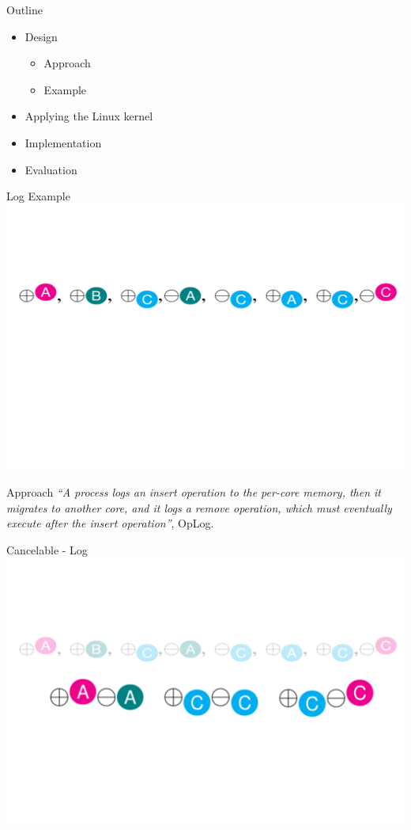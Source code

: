 \documentclass[english]{beamer} %
\begin{document}
\begin{frame}{Outline}
	\begin{itemize}
	\item Design
	\begin{itemize}
	\item Approach
	\item Example 
	\end{itemize}
	\item Applying the Linux kernel
	\item Implementation
	\item Evaluation
	\end{itemize}
\end{frame}




\begin{frame}{Log Example}
\includegraphics[scale=0.5]{fig/example_1}
\end{frame}


\begin{frame}{Approach}
\textit{``A process logs an insert operation to the per-core memory, then
it migrates to another core, and it logs a remove operation, which must
eventually execute after the insert operation''}, OpLog.
\end{frame}



\begin{frame}{Cancelable - Log}
\includegraphics[scale=0.5]{fig/example_2}
\end{frame}
\end{document}
